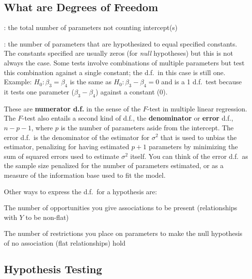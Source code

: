 \subsection{What are Degrees of Freedom}
\bd
\item[For a model]: the total number of parameters not counting
  intercept(s)
\item[For a hypothesis test]: the number of parameters that are
  hypothesized to equal specified constants.  The constants specified
  are usually zeros (for \emph{null} hypotheses) but this is not
  always the case.  Some tests involve combinations of multiple
  parameters but test this combination against a single constant; the
  d.f.\ in this case is still one.  Example: $H_{0}:
  \beta_{3}=\beta_{4}$ is the same as $H_{0}:\beta_{3}-\beta_{4}=0$
  and is a 1 d.f.\ test because it tests one parameter
  ($\beta_{3}-\beta_{4}$) against a constant ($0$).
\ed

These are \textbf{numerator d.f.} in the sense of the $F$-test in
multiple linear regression.  The $F$-test also entails a second kind
of d.f., the \textbf{denominator} or \textbf{error} d.f., $n-p-1$,
where $p$ is the number of parameters aside from the intercept.  The
error d.f.\ is the denominator of the estimator for $\sigma^2$ that is
used to unbias the estimator, penalizing for having estimated $p+1$
parameters by minimizing the sum of squared errors used to estimate
$\sigma^2$ itself.  You can think of the error d.f.\ as the sample
size penalized for the number of parameters estimated, or as a measure
of the information base used to fit the model.

Other ways to express the d.f.\ for a hypothesis are:
\bi
\item The number of opportunities you give associations to be present (relationships with $Y$ to be non-flat)
\item The number of restrictions you place on parameters to make the null hypothesis of no association (flat relationships) hold
\ei

\subsection{Hypothesis Testing} 
